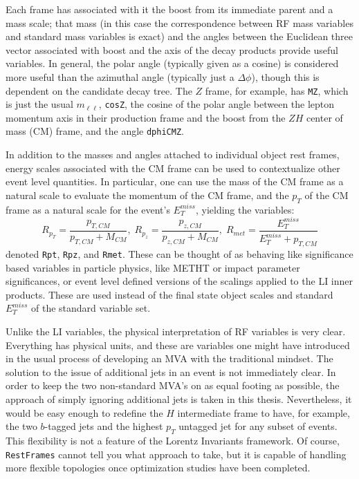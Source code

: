 Each frame has associated with it the boost from its immediate parent and a mass scale; that mass (in this case the correspondence between RF mass variables and standard mass variables is exact) and the angles between the Euclidean three vector associated with boost and the axis of the decay products provide useful variables.  In general, the polar angle (typically given as a cosine) is considered more useful than the azimuthal angle (typically just a $\Delta\phi$), though this is dependent on the candidate decay tree.  The $Z$ frame, for example, has \texttt{MZ}, which is just the usual $m_{\ell\ell}$, \texttt{cosZ}, the cosine of the polar angle between the lepton momentum axis in their production frame and the boost from the $ZH$ center of mass (CM) frame, and the angle \texttt{dphiCMZ}.

In addition to the masses and angles attached to individual object rest frames, energy scales associated with the CM frame can be used to contextualize other event level quantities.  In particular, one can use the mass of the CM frame as a natural scale to evaluate the momentum of the CM frame, and the $p_T$ of the CM frame as a natural scale for the event's $E_T^{miss}$, yielding the variables:
\begin{equation}
\label{eqn:Rrjr}
R_{p_T} = \frac{p_{T,CM}}{p_{T,CM}+M_{CM}},\;R_{p_z} = \frac{p_{z,CM}}{p_{z,CM}+M_{CM}},\;R_{met} = \frac{E_T^{miss}}{E_T^{miss}+p_{T,CM}}
\end{equation}
denoted \texttt{Rpt}, \texttt{Rpz}, and \texttt{Rmet}.  These can be thought of as behaving like significance based variables in particle physics, like METHT or impact parameter significances, or event level defined versions of the scalings applied to the LI inner products.  These are used instead of the final state object scales and standard $E_T^{miss}$ of the standard variable set.

Unlike the LI variables, the physical interpretation of RF variables is very clear.  Everything has physical units, and these are variables one might have introduced in the usual process of developing an MVA with the traditional mindset.  The solution to the issue of additional jets in an event is not immediately clear.  In order to keep the two non-standard MVA's on as equal footing as possible, the approach of simply ignoring additional jets is taken in this thesis.  Nevertheless, it would be easy enough to redefine the $H$ intermediate frame to have, for example, the two $b$-tagged jets and the highest $p_T$ untagged jet for any subset of events.  This flexibility is not a feature of the Lorentz Invariants framework.  Of course, \texttt{RestFrames} cannot tell you what approach to take, but it is capable of handling more flexible topologies once optimization studies have been completed.

